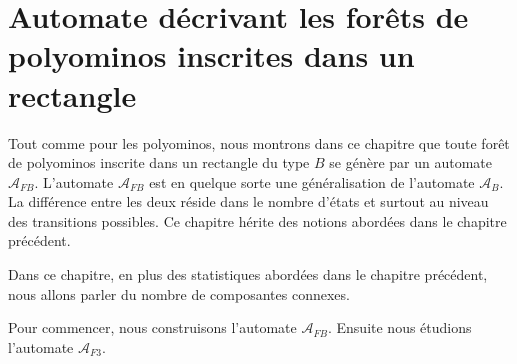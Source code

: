 \chapter{Automate décrivant les forêts de polyominos inscrites dans un rectangle}	

Tout comme pour les polyominos, nous  montrons dans ce chapitre que toute forêt de polyominos inscrite dans un rectangle du type $B$  se génère  par un automate $\mathcal{A}_{FB}$. L'automate $\mathcal{A}_{FB}$ est en quelque sorte une généralisation de l'automate $\mathcal{A}_{B}$. La différence entre les deux réside dans le nombre d'états et surtout au niveau des transitions possibles. Ce chapitre  hérite  des notions abordées dans le chapitre précédent.

Dans ce chapitre, en plus des statistiques abordées dans le chapitre précédent, nous allons parler du nombre de composantes connexes.

Pour commencer, nous construisons l'automate $\mathcal{A}_{FB}$. Ensuite nous étudions l'automate  $\mathcal{A}_{F3}$.

